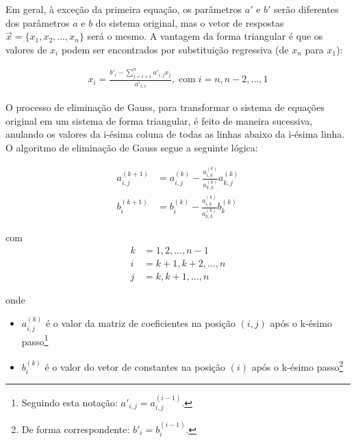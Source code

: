 \documentclass[final,5p]{elsarticle}
\numberwithin{equation}{section}
\begin{document}
            Em geral, à exceção da primeira equação, os parâmetros $a'$ e $b'$ serão diferentes dos parâmetros $a$ e $b$ do sistema original, mas o vetor de respostas $\overrightarrow{x}=\{x_1,x_2,\ldots,x_n\}$ será o mesmo. A vantagem da forma triangular é que os valores de $x_i$ podem ser encontrados por substituição regressiva (de $x_n$ para $x_1$):

            \begin{align}
                x_{i} = \frac{b'_i - \sum_{j=i+1}^{n} a'_{i,j} x_j}{a'_{i,i}}, \; \text{com} \; i=n,n-2,\ldots,1 \label{eq:subsregressiva}
            \end{align}

            O processo de eliminação de Gauss, para transformar o sistema de equações original em um sistema de forma triangular, é feito de maneira sucessiva, anulando os valores da i-ésima coluna de todas as linhas abaixo da i-ésima linha.
            O algoritmo de eliminação de Gauss segue a seguinte lógica:

            \begin{subequations}
                \begin{align}
                    a^{(k+1)}_{i,j} &= a^{(k)}_{i,j} - \frac{a^{(k)}_{i,k}}{a^{(k)}_{k,k}} a^{(k)}_{k,j}  \\
                    b^{(k+1)}_{i} &= b^{(k)}_{i} - \frac{a^{(k)}_{i,k}}{a^{(k)}_{k,k}} b^{(k)}_{k}
                \end{align} \label{eq:atualizacao}
            \end{subequations}

            \noindent com
            \begin{align}
                k &= 1,2,\ldots,n-1 \nonumber \\
                i &= k+1,k+2,\ldots,n \nonumber \\
                j &= k,k+1,\ldots,n \nonumber
            \end{align}

            \noindent onde
            \begin{itemize}
                \item[] $a^{(k)}_{i,j}$ é o valor da matriz de coeficientes na posição $(i,j)$ após o k-ésimo passo\footnote{Seguindo esta notação: $a'_{i,j} = a^{(i-1)}_{i,j}$.}
                \item[] $b^{(k)}_{i}$ é o valor do vetor de constantes na posição $(i)$ após o k-ésimo passo\footnote{De forma correspondente: $b'_i = b^{(i-1)}_i$.}
            \end{itemize}
\end{document}
